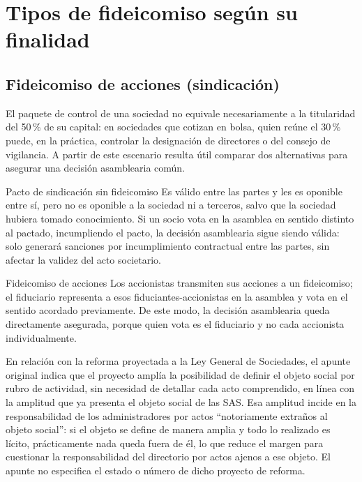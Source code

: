 \documentclass[12pt,oneside]{book}
\begin{document}
\chapter{Tipos de fideicomiso según su finalidad}

\section{Fideicomiso de acciones (sindicación)}

El paquete de control de una sociedad no equivale necesariamente a la titularidad del 50\,\% de su capital: en sociedades que cotizan en bolsa, quien reúne el 30\,\% puede, en la práctica, controlar la designación de directores o del consejo de vigilancia. A partir de este escenario resulta útil comparar dos alternativas para asegurar una decisión asamblearia común.

\begin{definition}{Pacto de sindicación sin fideicomiso}
Es válido entre las partes y les es oponible entre sí, pero no es oponible a la sociedad ni a terceros, salvo que la sociedad hubiera tomado conocimiento. Si un socio vota en la asamblea en sentido distinto al pactado, incumpliendo el pacto, la decisión asamblearia sigue siendo válida: solo generará sanciones por incumplimiento contractual entre las partes, sin afectar la validez del acto societario.
\end{definition}

\begin{definition}{Fideicomiso de acciones}
Los accionistas transmiten sus acciones a un fideicomiso; el fiduciario representa a esos fiduciantes-accionistas en la asamblea y vota en el sentido acordado previamente. De este modo, la decisión asamblearia queda directamente asegurada, porque quien vota es el fiduciario y no cada accionista individualmente.
\end{definition}

\begin{note}
En relación con la reforma proyectada a la Ley General de Sociedades, el apunte original indica que el proyecto amplía la posibilidad de definir el objeto social por rubro de actividad, sin necesidad de detallar cada acto comprendido, en línea con la amplitud que ya presenta el objeto social de las SAS. Esa amplitud incide en la responsabilidad de los administradores por actos ``notoriamente extraños al objeto social'': si el objeto se define de manera amplia y todo lo realizado es lícito, prácticamente nada queda fuera de él, lo que reduce el margen para cuestionar la responsabilidad del directorio por actos ajenos a ese objeto. El apunte no especifica el estado o número de dicho proyecto de reforma.
\end{note}
\end{document}
